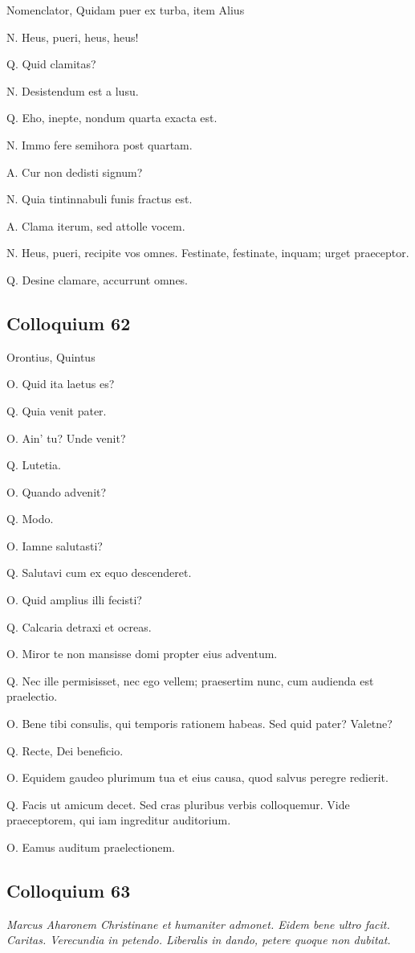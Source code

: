 \documentclass{article}
\begin{document}
Nomenclator, Quidam puer ex turba, item Alius

N. Heus, pueri, heus, heus!

Q. Quid clamitas?

N. Desistendum est a lusu.

Q. Eho, inepte, nondum quarta exacta est.

N. Immo fere semihora post quartam.

A. Cur non dedisti signum?

N. Quia tintinnabuli funis fractus est.

A. Clama iterum, sed attolle vocem.

 
N. Heus, pueri, recipite vos omnes. Festinate, festinate, inquam; urget praeceptor.

Q. Desine clamare, accurrunt omnes.

\subsection{Colloquium 62}
Orontius, Quintus

O. Quid ita laetus es?

Q. Quia venit pater.

O. Ain' tu? Unde venit?

Q. Lutetia.

O. Quando advenit?

Q. Modo.

O. Iamne salutasti?

Q. Salutavi cum ex equo descenderet.

O. Quid amplius illi fecisti?

Q. Calcaria detraxi et ocreas.

O. Miror te non mansisse domi propter eius adventum.

Q. Nec ille permisisset, nec ego vellem; praesertim nunc, cum audienda est praelectio.

O. Bene tibi consulis, qui temporis rationem habeas. Sed quid pater? Valetne?

Q. Recte, Dei beneficio.

O. Equidem gaudeo plurimum tua et eius causa, quod salvus peregre redierit.

Q. Facis ut amicum decet. Sed cras pluribus verbis colloquemur. Vide praeceptorem, qui iam ingreditur auditorium.

O. Eamus auditum praelectionem.

\subsection{Colloquium 63}
\emph{Marcus Aharonem Christinane et humaniter admonet. Eidem bene ultro facit. Caritas. Verecundia in petendo. Liberalis in dando, petere quoque non dubitat.}
\end{document}
